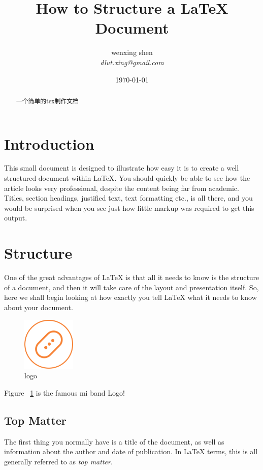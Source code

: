 \documentclass{article}%
\begin{document}
\title{How to Structure a \LaTeX{} Document} %
\author{wenxing shen\\%
  \emph{dlut.xing@gmail.com} %
}
\date{\today}
\maketitle %
\begin{abstract}
  一个简单的tex制作文档
\end{abstract}
\section{Introduction}%
\label{sec:intro}
This small document is designed to illustrate how easy it is to create a
well structured document within \LaTeX\cite{lamport94}.  You should quickly be able to
see how the article looks very professional, despite the content being
far from academic.  Titles, section headings, justified text, text
formatting etc., is all there, and you would be surprised when you see
just how little markup was required to get this output.

\section{Structure}
One of the great advantages of \LaTeX{} is that all it needs to know is
the structure of a document, and then it will take care of the layout
and presentation itself.  So, here we shall begin looking at how exactly
you tell \LaTeX{} what it needs to know about your document.
\begin{figure}
  \centering
   \includegraphics[width=1in]{miband_offline.png}
  \caption{logo}
  \label{fig:logo}
\end{figure}

Figure~ \ref{fig:logo} is the famous mi band Logo!
\subsection{Top Matter}
The first thing you normally have is a title of the document, as well as
information about the author and date of publication.  In \LaTeX{} terms,
this is all generally referred to as \emph{top matter}.
\end{document}
